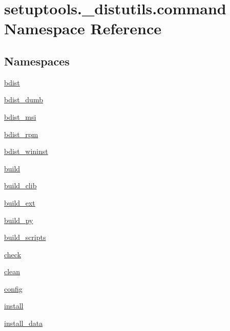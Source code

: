 \hypertarget{namespacesetuptools_1_1__distutils_1_1command}{}\section{setuptools.\+\_\+distutils.\+command Namespace Reference}
\label{namespacesetuptools_1_1__distutils_1_1command}
\subsection*{Namespaces}
\begin{DoxyCompactItemize}
\item 
 \hyperlink{namespacesetuptools_1_1__distutils_1_1command_1_1bdist}{bdist}
\item 
 \hyperlink{namespacesetuptools_1_1__distutils_1_1command_1_1bdist__dumb}{bdist\+\_\+dumb}
\item 
 \hyperlink{namespacesetuptools_1_1__distutils_1_1command_1_1bdist__msi}{bdist\+\_\+msi}
\item 
 \hyperlink{namespacesetuptools_1_1__distutils_1_1command_1_1bdist__rpm}{bdist\+\_\+rpm}
\item 
 \hyperlink{namespacesetuptools_1_1__distutils_1_1command_1_1bdist__wininst}{bdist\+\_\+wininst}
\item 
 \hyperlink{namespacesetuptools_1_1__distutils_1_1command_1_1build}{build}
\item 
 \hyperlink{namespacesetuptools_1_1__distutils_1_1command_1_1build__clib}{build\+\_\+clib}
\item 
 \hyperlink{namespacesetuptools_1_1__distutils_1_1command_1_1build__ext}{build\+\_\+ext}
\item 
 \hyperlink{namespacesetuptools_1_1__distutils_1_1command_1_1build__py}{build\+\_\+py}
\item 
 \hyperlink{namespacesetuptools_1_1__distutils_1_1command_1_1build__scripts}{build\+\_\+scripts}
\item 
 \hyperlink{namespacesetuptools_1_1__distutils_1_1command_1_1check}{check}
\item 
 \hyperlink{namespacesetuptools_1_1__distutils_1_1command_1_1clean}{clean}
\item 
 \hyperlink{namespacesetuptools_1_1__distutils_1_1command_1_1config}{config}
\item 
 \hyperlink{namespacesetuptools_1_1__distutils_1_1command_1_1install}{install}
\item 
 \hyperlink{namespacesetuptools_1_1__distutils_1_1command_1_1install__data}{install\+\_\+data}

\end{DoxyCompactItemize}
